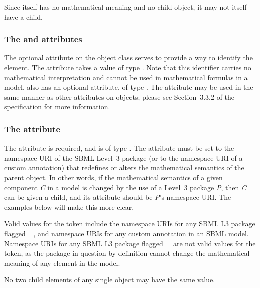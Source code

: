 Since \ChangedMath itself has no mathematical meaning and no child \Math object, it may not itself have a \ChangedMath child.


\subsubsection{The \fixttspace{} and \fixttspace{} attributes}
\label{idname-attributes}

The optional  attribute on the \ChangedMath object class serves to provide a way to identify the element.  The attribute takes a value of type .  Note that this identifier carries no mathematical interpretation and cannot be used in mathematical formulas in a model.  \ChangedMath also has an optional  attribute, of type .  The  attribute may be used in the same manner as other  attributes on \sbmlthreecore objects; please see Section~3.3.2 of the \sbmlthreecore specification for more information.


\subsubsection{The \fixttspace{} attribute}
\label{attribute-changedBy}

The  attribute is required, and is of type .  The attribute must be set to the namespace URI of the SBML Level~3 package (or to the namespace URI of a custom annotation) that redefines or alters the mathematical semantics of the parent object.  In other words, if the mathematical semantics of a given component \emph{C} in a model is changed by the use of a Level~3 package \emph{P}, then \emph{C} can be given a \ChangedMath child, and its attribute  should be \emph{P}'s namespace URI.  The examples below will make this more clear.

Valid values for the  token include the namespace URIs for any SBML L3 package flagged  =, and namespace URIs for any custom annotation in an SBML model.  Namespace URIs for any SBML L3 package flagged = are not valid values for the  token, as the package in question by definition cannot change the mathematical meaning of any element in the model.

No two child \ChangedMath elements of any single \SBase object may have the same  value.  



